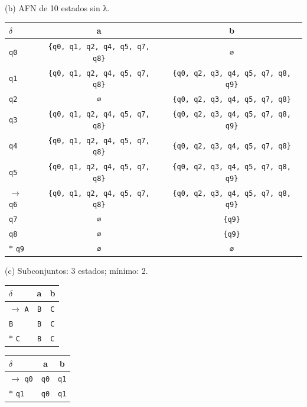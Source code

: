 \documentclass[11pt]{article}
\begin{document}
(b) AFN de 10 estados sin λ.\begin{center}\small\begin{tabular}{lcc}\toprule
$\delta$ & a & b \\\midrule
 \texttt{q0} & \texttt{\{q0, q1, q2, q4, q5, q7, q8\}} & \texttt{∅} \\
 \texttt{q1} & \texttt{\{q0, q1, q2, q4, q5, q7, q8\}} & \texttt{\{q0, q2, q3, q4, q5, q7, q8, q9\}} \\
 \texttt{q2} & \texttt{∅} & \texttt{\{q0, q2, q3, q4, q5, q7, q8\}} \\
 \texttt{q3} & \texttt{\{q0, q1, q2, q4, q5, q7, q8\}} & \texttt{\{q0, q2, q3, q4, q5, q7, q8, q9\}} \\
 \texttt{q4} & \texttt{\{q0, q1, q2, q4, q5, q7, q8\}} & \texttt{\{q0, q2, q3, q4, q5, q7, q8\}} \\
 \texttt{q5} & \texttt{\{q0, q1, q2, q4, q5, q7, q8\}} & \texttt{\{q0, q2, q3, q4, q5, q7, q8, q9\}} \\
$\to$ \texttt{q6} & \texttt{\{q0, q1, q2, q4, q5, q7, q8\}} & \texttt{\{q0, q2, q3, q4, q5, q7, q8, q9\}} \\
 \texttt{q7} & \texttt{∅} & \texttt{\{q9\}} \\
 \texttt{q8} & \texttt{∅} & \texttt{\{q9\}} \\
$*$ \texttt{q9} & \texttt{∅} & \texttt{∅} \\
\bottomrule\end{tabular}\end{center}
(c) Subconjuntos: 3 estados; mínimo: 2.\begin{center}\small\begin{tabular}{lcc}\toprule
$\delta$ & a & b \\\midrule
$\to$ \texttt{A} & \texttt{B} & \texttt{C} \\
 \texttt{B} & \texttt{B} & \texttt{C} \\
$*$ \texttt{C} & \texttt{B} & \texttt{C} \\
\bottomrule\end{tabular}\end{center}
\begin{center}\small\begin{tabular}{lcc}\toprule
$\delta$ & a & b \\\midrule
$\to$ \texttt{q0} & \texttt{q0} & \texttt{q1} \\
$*$ \texttt{q1} & \texttt{q0} & \texttt{q1} \\
\bottomrule\end{tabular}\end{center}
\end{document}
